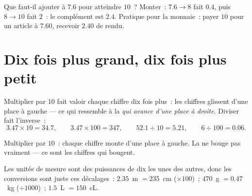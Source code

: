 \begin{example}\label{ex:g5:decimalops:complement}
Que faut-il ajouter à $7.6$ pour atteindre $10$~? Monter~:
$7.6 \to 8$ fait $0.4$, puis $8 \to 10$ fait $2$~: le complément
est $2.4$. Pratique pour la monnaie~: payer $10$ pour un article à
$7.60$, recevoir $2.40$ de rendu.
\end{example}

\section{Dix fois plus grand, dix fois plus petit}

\begin{proposition}\label{prop:g5:decimalops:shift}
Multiplier par $10$ fait valoir chaque chiffre dix fois plus~: les
chiffres glissent d'une place à gauche --- ce qui ressemble à la
\emph{ qui avance d'une place à droite}. Diviser fait
l'inverse~:
\[
3.47 \times 10 = 34.7, \qquad
3.47 \times 100 = 347, \qquad
52.1 \div 10 = 5.21, \qquad
6 \div 100 = 0.06 .
\]
\end{proposition}
\admitted

\begin{omfigure}

{\small Multiplier par $10$~: chaque chiffre monte d'une place à
gauche. La  ne bouge pas vraiment --- ce sont les chiffres
qui bougent.}
\end{omfigure}

\begin{example}\label{ex:g5:decimalops:convert}
Les unités de mesure sont des puissances de dix les unes des
autres, donc les conversions sont juste ces décalages~: $2.35$~m
$= 235$~cm ($\times 100$)~; $470$~g $= 0.47$~kg ($\div 1000$)~;
$1.5$~L $= 150$~cL.
\end{example}

